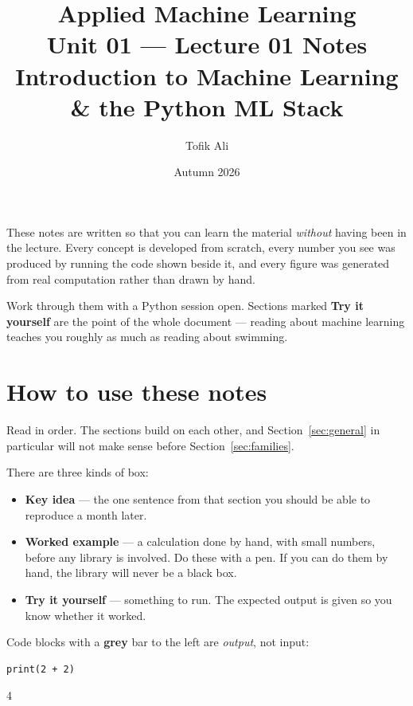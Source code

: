 \documentclass[11pt]{article}
\title{Applied Machine Learning\\Unit 01 --- Lecture 01 Notes\\
       Introduction to Machine Learning \& the Python ML Stack}
\author{Tofik Ali}
\date{Autumn 2026}
\begin{document}
\maketitle

\begin{keyidea}
These notes are written so that you can learn the material \emph{without}
having been in the lecture. Every concept is developed from scratch, every
number you see was produced by running the code shown beside it, and every
figure was generated from real computation rather than drawn by hand.

Work through them with a Python session open. Sections marked
\textbf{Try it yourself} are the point of the whole document --- reading about
machine learning teaches you roughly as much as reading about swimming.
\end{keyidea}

\tableofcontents
\newpage

\section{How to use these notes}

Read in order. The sections build on each other, and Section~\ref{sec:general}
in particular will not make sense before Section~\ref{sec:families}.

There are three kinds of box:

\begin{itemize}[leftmargin=*]
  \item \textbf{Key idea} --- the one sentence from that section you should be
    able to reproduce a month later.
  \item \textbf{Worked example} --- a calculation done by hand, with small
    numbers, before any library is involved. Do these with a pen. If you can do
    them by hand, the library will never be a black box.
  \item \textbf{Try it yourself} --- something to run. The expected output is
    given so you know whether it worked.
\end{itemize}

Code blocks with a \textbf{grey} bar to the left are \emph{output}, not input:

\begin{lstlisting}
print(2 + 2)
\end{lstlisting}
\begin{codeout}
4
\end{codeout}
\end{document}
